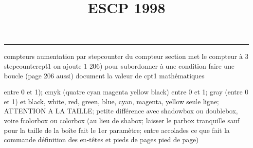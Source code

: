 \documentclass[11pt]{article}%
\title{\bf \vspace{-2cm} ESCP 1998} %
\author{} %
\date{} %
\renewcommand{\headrulewidth}{0pt}%
\renewcommand{\footrulewidth}{0.4pt}%
\begin{document}
\maketitle %
\vspace{-1.4cm}\hrule %
\thispagestyle{fancy}

\vspace*{.2cm}



compteurs%
aumentation par stepcounter du compteur section%
met le compteur à 3%
stepcounter{cpt1} on ajoute 1%
206) pour subordonner à une condition %
faire une boucle (page 206 aussi) %
document la valeur de cpt1 
mathématiques\newcommand{\ch}{\operatorname{ch}} 
\newcommand{\sh}{\operatorname{sh}}
\renewcommand{\tanh}{\operatorname{th}}
\renewcommand{\sinh}{\operatorname{sh}}
\renewcommand{\cosh}{\operatorname{ch}}
\newcommand{\argsh}{\operatorname{argsh}}
\newcommand{\argch}{\operatorname{argch}}
\newcommand{\argth}{\operatorname{argth}}
\newcommand{\ker}{\operatorname{Ker}}
\renewcommand{\im}{\operatorname{Im}}
\newcommand{\rg}{\operatorname{rg}}
\newcommand{\Id}{\operatorname{Id}}
\newcommand{\id}{\operatorname{id}}
\renewcommand{\leq}{\leq}
\renewcommand{\geq}{\geq }

entre 0 et 1); cmyk (quatre cyan magenta yellow black) entre 0 et 1;
gray (entre 0 et 1) et black, white, red, green, blue, cyan, magenta,
yellow%
seule ligne; ATTENTION A LA TAILLE; petite différence avec shadowbox ou
doublebox, voire fcolorbox ou colorbox (au lieu de shabox; laisser le
parbox tranquille sauf pour la taille de la boîte
\newcommand{\Tbox}[1]{\begin{center} \shabox{\parbox{0.6
\linewidth}{#1}} \end{center}} %
fait le 1er paramètre; entre accolades ce que fait la commande
définition des en-têtes et pieds de pages\pagestyle{fancy}
\chead{}
\rfoot[ \ \thepage]{\thepage}
\cfoot{}
\lfoot{}
\thispagestyle{fancy} %
pied de page)\renewcommand{\footrulewidth}{0.4pt}
\renewcommand{\headrulewidth}{0.4pt}
\end{document}
